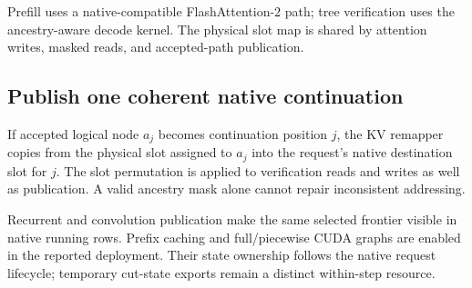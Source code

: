 \documentclass[conference]{IEEEtran}
\begin{document}
Prefill uses a native-compatible FlashAttention-2 path; tree verification uses the ancestry-aware decode kernel. The physical slot map is shared by attention writes, masked reads, and accepted-path publication.

\subsection{Publish one coherent native continuation}
If accepted logical node $a_j$ becomes continuation position $j$, the KV remapper copies from the physical slot assigned to $a_j$ into the request's native destination slot for $j$. The slot permutation is applied to verification reads and writes as well as publication. A valid ancestry mask alone cannot repair inconsistent addressing.

Recurrent and convolution publication make the same selected frontier visible in native running rows. Prefix caching and full/piecewise CUDA graphs are enabled in the reported deployment. Their state ownership follows the native request lifecycle; temporary cut-state exports remain a distinct within-step resource.
\end{document}
